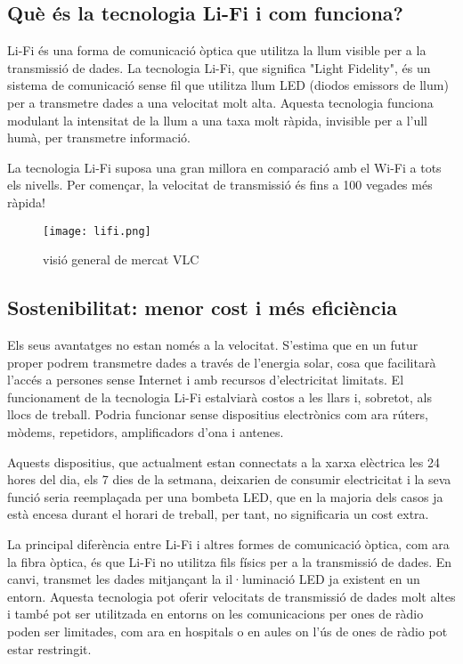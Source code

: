 
\subsection*{Què és la tecnologia Li-Fi i com funciona?}

Li-Fi és una forma de comunicació òptica que utilitza la llum visible per a la transmissió de dades. La tecnologia Li-Fi, que significa "Light Fidelity", és un sistema de comunicació sense fil que utilitza llum LED (diodos emissors de llum) per a transmetre dades a una velocitat molt alta. Aquesta tecnologia funciona modulant la intensitat de la llum a una taxa molt ràpida, invisible per a l'ull humà, per transmetre informació.

La tecnologia Li-Fi suposa una gran millora en comparació amb el Wi-Fi a tots els nivells. Per començar, la velocitat de transmissió és fins a 100 vegades més ràpida!

\begin{figure}[h!]
    \centering
    \texttt{[image: lifi.png]}
    \caption{visió general de mercat VLC}
    \label{fig:method}
\end{figure}


\subsection*{Sostenibilitat: menor cost i més eficiència}

Els seus avantatges no estan només a la velocitat. S'estima que en un futur proper podrem transmetre dades a través de l'energia solar, cosa que facilitarà l'accés a persones sense Internet i amb recursos d'electricitat limitats. El funcionament de la tecnologia Li-Fi estalviarà costos a les llars i, sobretot, als llocs de treball. Podria funcionar sense dispositius electrònics com ara rúters, mòdems, repetidors, amplificadors d'ona i antenes.

Aquests dispositius, que actualment estan connectats a la xarxa elèctrica les 24 hores del dia, els 7 dies de la setmana, deixarien de consumir electricitat i la seva funció seria reemplaçada per una bombeta LED, que en la majoria dels casos ja està encesa durant el horari de treball, per tant, no significaria un cost extra.

La principal diferència entre Li-Fi i altres formes de comunicació òptica, com ara la fibra òptica, és que Li-Fi no utilitza fils físics per a la transmissió de dades. En canvi, transmet les dades mitjançant la il·luminació LED ja existent en un entorn. Aquesta tecnologia pot oferir velocitats de transmissió de dades molt altes i també pot ser utilitzada en entorns on les comunicacions per ones de ràdio poden ser limitades, com ara en hospitals o en aules on l'ús de ones de ràdio pot estar restringit.

